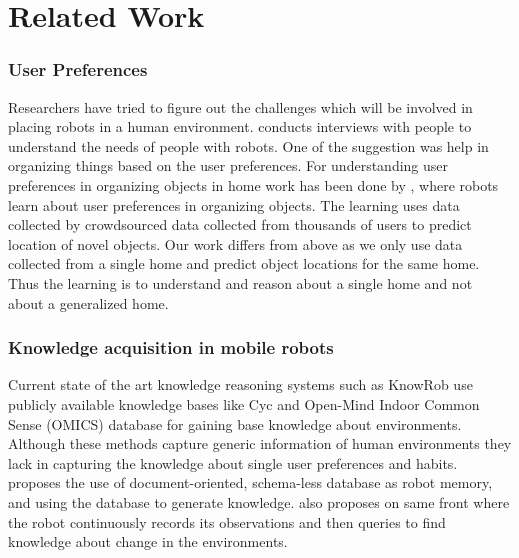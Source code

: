 \chapter{Related Work}


\subsection{User Preferences}
\label{sub:user preference}
Researchers have tried to figure out the challenges which will be involved in
placing robots in a human environment.\cite{pantofaru_exploring_2012} conducts
interviews with people to understand the needs of people with robots. One of the
suggestion was help in organizing things based on the user preferences.
For understanding user preferences in organizing objects in home work has 
been done by  \cite{abdo2015robot}, where robots learn about user
preferences in organizing objects. The learning uses data collected by 
crowdsourced data collected from thousands of users to predict location of 
novel objects. Our work differs from above as we only use data collected from a single home and predict object locations for the same home. Thus the learning is to understand and reason about a single home and not about a generalized home.

\subsection{Knowledge acquisition in mobile robots}
Current state of the art knowledge reasoning systems such as KnowRob \cite{tenorth2013knowrob} use publicly available knowledge bases like Cyc \cite{lenat1995cyc} and Open-Mind Indoor Common Sense (OMICS) database \cite{singh2002open} for gaining base knowledge about environments.  Although these methods capture generic information of human environments they lack in capturing the knowledge about single user preferences and habits. \cite{niemueller2012generic} proposes the use of document-oriented, schema-less database as robot memory, and using the database to generate knowledge. \cite{mason2012object} also proposes on same front where the robot continuously records its observations and then queries to find knowledge about change in the environments.


